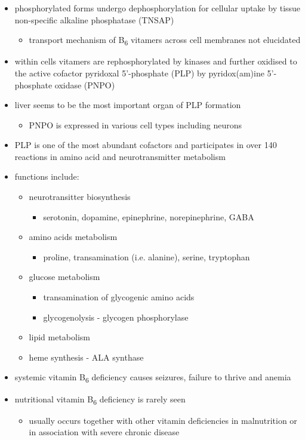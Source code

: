 \documentclass{scrartcl}
\begin{document}
\begin{itemize}
\item phosphorylated forms undergo dephosphorylation for cellular uptake
by tissue non-specific alkaline phosphatase (TNSAP)
\begin{itemize}
\item transport mechanism of B\textsubscript{6} vitamers across cell membranes not
elucidated
\end{itemize}
\item within cells vitamers are rephosphorylated by kinases and further oxidised to the
active cofactor pyridoxal 5’-phosphate (PLP) by pyridox(am)ine
5’-phosphate oxidase (PNPO)
\item liver seems to be the most important organ of PLP formation
\begin{itemize}
\item PNPO is expressed in various cell types including neurons
\end{itemize}
\item PLP is one of the most abundant cofactors and participates in over
140 reactions in amino acid and neurotransmitter metabolism
\item functions include:
\begin{itemize}
\item neurotransitter biosynthesis
\begin{itemize}
\item serotonin, dopamine, epinephrine, norepinephrine, GABA
\end{itemize}
\item amino acids metabolism
\begin{itemize}
\item proline, transamination (i.e. alanine), serine, tryptophan
\end{itemize}
\item glucose metabolism
\begin{itemize}
\item transamination of glycogenic amino acids
\item glycogenolysis - glycogen phosphorylase
\end{itemize}
\item lipid metabolism
\item heme synthesis - ALA synthase
\end{itemize}
\item systemic vitamin B\textsubscript{6} deficiency causes seizures, failure to thrive
and anemia
\item nutritional vitamin B\textsubscript{6} deficiency is rarely seen
\begin{itemize}
\item usually occurs together with other vitamin deficiencies in
malnutrition or in association with severe chronic disease
\end{itemize}
\end{itemize}
\end{document}
